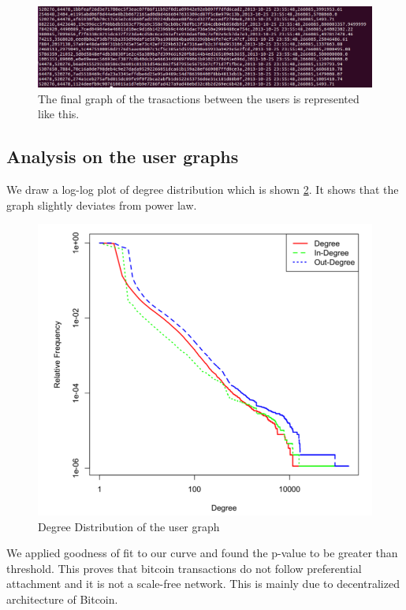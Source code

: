 \documentclass[runningheads,a4paper]{llncs}[2017/09/04]
\begin{document}
\begin{figure}[h]
	\centering 
	\includegraphics[width=\columnwidth]{final} 
	\caption{The final graph of the trasactions between the users is represented like this.} %
	\label{final}
\end{figure}


\subsection{Analysis on the user graphs}

We draw a log-log plot of degree distribution which is shown \ref{degree}. 
It shows that the graph slightly deviates from power law.

\begin{figure}[h]
	\centering 
	\includegraphics[width=0.8\columnwidth]{degree} 
	\caption{Degree Distribution of the user graph} %
	\label{degree}
\end{figure}

We applied goodness of fit to our curve and found the p-value to be greater than threshold.
This proves that bitcoin transactions do not follow preferential attachment and it is not a scale-free network. This is mainly due to decentralized architecture of Bitcoin.
\end{document}
